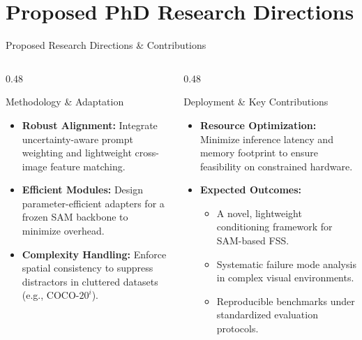 \documentclass[aspectratio=169, 10pt]{beamer}
\begin{document}
\section{Proposed PhD Research Directions}

\begin{frame}{Proposed Research Directions \& Contributions}
    \begin{columns}[T]
        \begin{column}{0.48\textwidth}
            \begin{block}{Methodology \& Adaptation}
                \footnotesize
                \begin{itemize}
                    \item \textbf{Robust Alignment:} Integrate uncertainty-aware prompt weighting and lightweight cross-image feature matching.
                    \item \textbf{Efficient Modules:} Design parameter-efficient adapters for a frozen SAM backbone to minimize overhead.
                    \item \textbf{Complexity Handling:} Enforce spatial consistency to suppress distractors in cluttered datasets (e.g., COCO-$20^i$).
                \end{itemize}
            \end{block}
        \end{column}
        
        \begin{column}{0.48\textwidth}
            \begin{block}{Deployment \& Key Contributions}
                \footnotesize
                \begin{itemize}
                    \item \textbf{Resource Optimization:} Minimize inference latency and memory footprint to ensure feasibility on constrained hardware.
                    \item \textbf{Expected Outcomes:}
                    \begin{itemize}
                        \footnotesize
                        \item A novel, lightweight conditioning framework for SAM-based FSS.
                        \item Systematic failure mode analysis in complex visual environments.
                        \item Reproducible benchmarks under standardized evaluation protocols.
                    \end{itemize}
                \end{itemize}
            \end{block}
        \end{column}
    \end{columns}
\end{frame}
\end{document}
